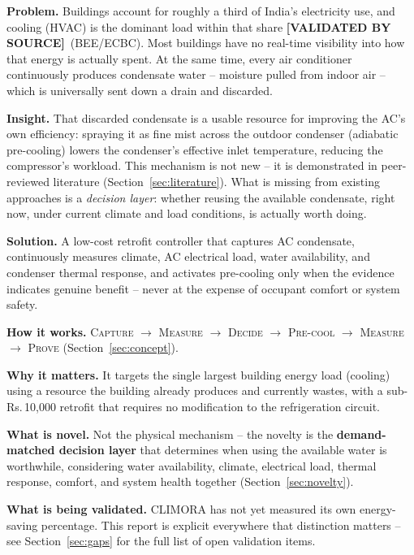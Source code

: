 \documentclass[11pt,a4paper]{article}
\newcommand{\textrupee}{Rs.\,}
\newcommand{\validated}{\textcolor{climoragreen}{\textbf{[VALIDATED BY SOURCE]}}}
\begin{document}
\textbf{Problem.} Buildings account for roughly a third of India's electricity use, and cooling (HVAC) is the dominant load within that share \validated\ (BEE/ECBC). Most buildings have no real-time visibility into how that energy is actually spent. At the same time, every air conditioner continuously produces condensate water -- moisture pulled from indoor air -- which is universally sent down a drain and discarded.

\textbf{Insight.} That discarded condensate is a usable resource for improving the AC's own efficiency: spraying it as fine mist across the outdoor condenser (adiabatic pre-cooling) lowers the condenser's effective inlet temperature, reducing the compressor's workload. This mechanism is not new -- it is demonstrated in peer-reviewed literature (Section~\ref{sec:literature}). What is missing from existing approaches is a \emph{decision layer}: whether reusing the available condensate, right now, under current climate and load conditions, is actually worth doing.

\textbf{Solution.} A low-cost retrofit controller that captures AC condensate, continuously measures climate, AC electrical load, water availability, and condenser thermal response, and activates pre-cooling only when the evidence indicates genuine benefit -- never at the expense of occupant comfort or system safety.

\textbf{How it works.} \textsc{Capture} $\rightarrow$ \textsc{Measure} $\rightarrow$ \textsc{Decide} $\rightarrow$ \textsc{Pre-cool} $\rightarrow$ \textsc{Measure} $\rightarrow$ \textsc{Prove} (Section~\ref{sec:concept}).

\textbf{Why it matters.} It targets the single largest building energy load (cooling) using a resource the building already produces and currently wastes, with a sub-\textrupee10{,}000 retrofit that requires no modification to the refrigeration circuit.

\textbf{What is novel.} Not the physical mechanism -- the novelty is the \textbf{demand-matched decision layer} that determines when using the available water is worthwhile, considering water availability, climate, electrical load, thermal response, comfort, and system health together (Section~\ref{sec:novelty}).

\textbf{What is being validated.} CLIMORA has not yet measured its own energy-saving percentage. This report is explicit everywhere that distinction matters -- see Section~\ref{sec:gaps} for the full list of open validation items.
\end{document}
